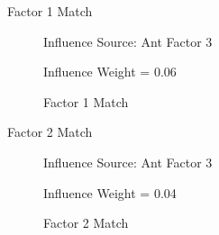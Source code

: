 \documentclass[handout]{beamer}
\begin{document}
\begin{frame}{Factor 1 Match}
\begin{figure}%
    \centering
    \qquad
    \caption{Factor 1 Match}%
    \label{fig:com1}%
    Influence Source: Ant Factor 3 
    \par Influence Weight = 0.06
\end{figure}

\end{frame}

\begin{frame}{Factor 2 Match}
\begin{figure}%
    \centering
    \qquad
    \caption{Factor 2 Match}%
    \label{fig:com2}%
    Influence Source: Ant Factor 3 
    \par Influence Weight = 0.04
\end{figure}
\end{frame}
\end{document}

